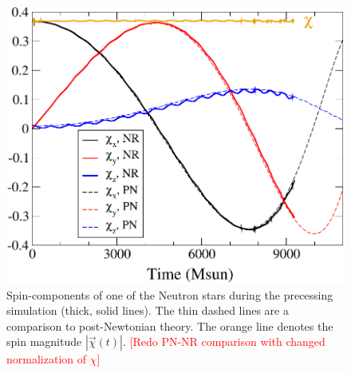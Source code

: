 \documentclass[aps,prd,amsmath,floatfix
,twocolumn
,superscriptaddress,nofootinbib,showpacs]{revtex4-1}
\theoremstyle{plain} \newtheorem{thm}{Theorem} \newtheorem{lem}{Lemma}
\newcommand{\red}[1]{\textcolor{Red}{#1}}
\begin{document}



\begin{figure}
\includegraphics[width=0.95\columnwidth]{SpinComparison}
  \caption{\label{fig:FullPrec} Spin-components of one of the Neutron stars during the precessing simulation (thick, solid lines).  The thin dashed lines are a comparison to post-Newtonian theory.  The orange line denotes the spin magnitude $|\vec\chi(t)|$. \red{[Redo PN-NR comparison with changed normalization of $\chi$]} }
\end{figure}
\end{document}
